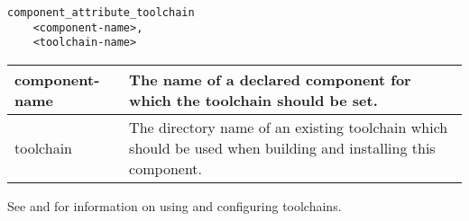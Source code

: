 \begin{minipage}{\linewidth}
\begin{verbatim}
component_attribute_toolchain
    <component-name>,
    <toolchain-name>
\end{verbatim}

\begin{tabularx}{\linewidth}{l|X}
component-name &
  The name of a declared component for which the toolchain should be
  set. \\

\hline toolchain &
  The directory name of an existing toolchain which should be
  used when building and installing this component.
\end{tabularx}

See  and
 for information on using and
configuring toolchains.
\end{minipage}
